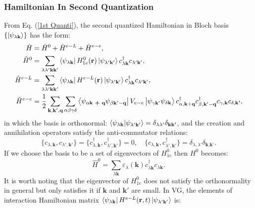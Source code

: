 \documentclass[12pt,english,a4paper]{article}
\newcommand{\dg}{\dagger}
\begin{document}
	\subsubsection{Hamiltonian In Second Quantization}
\quad From Eq. (\ref{1st Quanti}), the second quantized Hamiltonian in Bloch basis $\{\ket{\psi_{\lambda \textbf{k}}}\}$ has the form:
	\begin{align}
		\hat{H} &= \hat{H}^0 + \hat{H}^{e-L}  + \hat{H}^{e-e}\nonumber,\\
		\label{Second Hamiltonian}
		\hat{H}^0 &= \sum_{\lambda \lambda' \textbf{k}\textbf{k}'} \bra{\psi_{\lambda \textbf{k}}} H^0_{1e} (\textbf{r})\ket{\psi_{\lambda' \textbf{k}'}} c^\dg_{\lambda \textbf{k}} c_{\lambda' \textbf{k}
		'} ,\\
		\hat{H}^{e-L} &= \sum_{\lambda \lambda' \textbf{k}\textbf{k}'} \bra{\psi_{\lambda \textbf{k}}} H^{e-L} (\textbf{r})\ket{\psi_{\lambda' \textbf{k}'}} c^\dg_{\lambda \textbf{k}} c_{\lambda' \textbf{k}
			'}\nonumber ,\\
\hat{H}^{e-e}	&= \frac{1}{2} \sum_{\textbf{k}, \textbf{k}', \textbf{q}} \sum_{\alpha \beta \gamma \delta} \bra{\psi_{\alpha \textbf{k + q}} \psi_{\beta \textbf{k}' - \textbf{q}}} V_{e-e} \ket{\psi_{\gamma \textbf{k}'} \psi_{\delta \textbf{k}}} c_{\alpha, \textbf{k}+\textbf{q}}^\dg c_{\beta, \textbf{k}' - \textbf{q}}^\dg c_{\gamma, \textbf{k}}c_{\delta, \textbf{k'}} \nonumber,
	\end{align}
in which the basis is orthonormal: $\braket{\psi_{\lambda \textbf{k}}}{\psi_{\lambda' \textbf{k}'}} = \delta_{\lambda\lambda'}\delta_{\textbf{k}\textbf{k'}}$, and the creation and annihilation operators satisfy the anti-commutator relations:
	\begin{equation}
		\label{fermion comm}
		\big\{c_{\lambda,\textbf{k}}, c_{\lambda', \textbf{k}'}\big\} =\big\{c^\dg_{\lambda,\textbf{k}}, c^\dg_{\lambda', \textbf{k}'}\big\} = 0, \quad \big\{c_{\lambda,\textbf{k}}, c^\dg_{\lambda', \textbf{k}'}\big\} = \delta_{\lambda,\lambda'}\delta_{\textbf{k},\textbf{k'}}.
	\end{equation}
\quad If we choose the basis to be a set of eigenvectors of $H^0_{1e}$ then $H^0$ becomes:
	\begin{equation}
		\hat{H}^0 = \sum_{\lambda \textbf{k}} \varepsilon_{\lambda}(\textbf{k})c^\dg_{\lambda \textbf{k}} c_{\lambda \textbf{k}}.
	\end{equation}
\quad It is worth noting that the eigenvector of $H^0_{1e}$ does not satisfy the orthonormality in general but only satisfies it if $\textbf{k}$ and $\textbf{k}'$ are small. In VG, the elements of interaction Hamiltonian matrix $\bra{\psi_{\lambda\textbf{k}}}H^{e-L}(\textbf{r},t)\ket{\psi_{\lambda'\textbf{k}'}}$ is:
\end{document}
